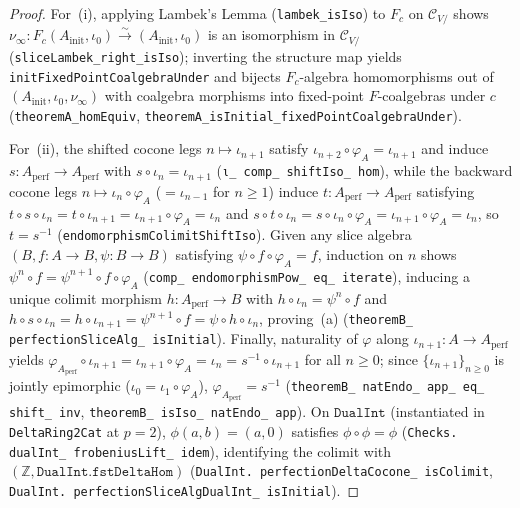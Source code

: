 \begin{proof}
For~(i), applying Lambek's Lemma (\texttt{lambek\_isIso}) to $F_c$ on $\mathcal{C}_{V/}$ shows $\nu_\infty : F_c(A_{\mathrm{init}}, \iota_0) \xrightarrow{\sim} (A_{\mathrm{init}}, \iota_0)$ is an isomorphism in $\mathcal{C}_{V/}$ (\texttt{sliceLambek\_right\_isIso}); inverting the structure map yields \texttt{initFixedPointCoalgebraUnder} and bijects $F_c$-algebra homomorphisms out of $(A_{\mathrm{init}}, \iota_0, \nu_\infty)$ with coalgebra morphisms into fixed-point $F$-coalgebras under $c$ (\texttt{theoremA\_homEquiv}, \texttt{theoremA\_isInitial\_fixedPointCoalgebraUnder}).

For~(ii), the shifted cocone legs $n \mapsto \iota_{n+1}$ satisfy $\iota_{n+2} \circ \varphi_A = \iota_{n+1}$ and induce $s : A_{\mathrm{perf}} \to A_{\mathrm{perf}}$ with $s \circ \iota_n = \iota_{n+1}$ (\texttt{ι\_ comp\_ shiftIso\_ hom}), while the backward cocone legs $n \mapsto \iota_n \circ \varphi_A$ ($= \iota_{n-1}$ for $n \ge 1$) induce $t : A_{\mathrm{perf}} \to A_{\mathrm{perf}}$ satisfying $t \circ s \circ \iota_n = t \circ \iota_{n+1} = \iota_{n+1} \circ \varphi_A = \iota_n$ and $s \circ t \circ \iota_n = s \circ \iota_n \circ \varphi_A = \iota_{n+1} \circ \varphi_A = \iota_n$, so $t = s^{-1}$ (\texttt{endomorphismColimitShiftIso}). Given any slice algebra $(B, f : A \to B, \psi : B \to B)$ satisfying $\psi \circ f \circ \varphi_A = f$, induction on $n$ shows $\psi^n \circ f = \psi^{n+1} \circ f \circ \varphi_A$ (\texttt{comp\_ endomorphismPow\_ eq\_ iterate}), inducing a unique colimit morphism $h : A_{\mathrm{perf}} \to B$ with $h \circ \iota_n = \psi^n \circ f$ and $h \circ s \circ \iota_n = h \circ \iota_{n+1} = \psi^{n+1} \circ f = \psi \circ h \circ \iota_n$, proving~(a) (\texttt{theoremB\_ perfectionSliceAlg\_ isInitial}). Finally, naturality of $\varphi$ along $\iota_{n+1} : A \to A_{\mathrm{perf}}$ yields $\varphi_{A_{\mathrm{perf}}} \circ \iota_{n+1} = \iota_{n+1} \circ \varphi_A = \iota_n = s^{-1} \circ \iota_{n+1}$ for all $n \ge 0$; since $\{\iota_{n+1}\}_{n \ge 0}$ is jointly epimorphic ($\iota_0 = \iota_1 \circ \varphi_A$), $\varphi_{A_{\mathrm{perf}}} = s^{-1}$ (\texttt{theoremB\_ natEndo\_ app\_ eq\_ shift\_ inv}, \texttt{theoremB\_ isIso\_ natEndo\_ app}). On $\mathtt{DualInt}$ (instantiated in \texttt{DeltaRing2Cat} at $p = 2$), $\phi(a, b) = (a, 0)$ satisfies $\phi \circ \phi = \phi$ (\texttt{Checks. dualInt\_ frobeniusLift\_ idem}), identifying the colimit with $(\mathbb{Z}, \mathtt{DualInt.fstDeltaHom})$ (\texttt{DualInt. perfectionDeltaCocone\_ isColimit}, \texttt{DualInt. perfectionSliceAlgDualInt\_ isInitial}).
\end{proof}

